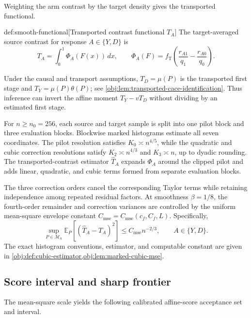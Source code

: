 \documentclass[11pt]{article}
\begin{document}
Weighting the arm contrast by the target density gives the transported functional.

\begin{definitionv}{def:smooth-functional}[Transported contrast functional \(T_A\)]
The target-averaged source contrast for response \(A\in\{Y,D\}\) is
\[
T_A=\int_0^1\Phi_A(F(x))\,dx,
\qquad
\Phi_A(F)=f_{\mathrm T}
\left(\frac{r_{A1}}{q_1}-\frac{r_{A0}}{q_0}\right).
\]
\end{definitionv}

Under the causal and transport assumptions, \(T_D=\mu(P)\) is the transported first stage and \(T_Y=\mu(P)\theta(P)\); see \cref{obj:lem:transported-cace-identification}. Thus inference can invert the affine moment \(T_Y-vT_D\) without dividing by an estimated first stage.

For \(n\ge n_0=256\), each source and target sample is split into one pilot block and three evaluation blocks. Blockwise marked histograms estimate all seven coordinates. The pilot resolution satisfies \(K_0\asymp n^{4/5}\), while the quadratic and cubic correction resolutions satisfy \(K_2\asymp n^{4/3}\) and \(K_3\asymp n\), up to dyadic rounding. The transported-contrast estimator \(\widehat T_A\) expands \(\Phi_A\) around the clipped pilot and adds linear, quadratic, and cubic terms formed from separate evaluation blocks.

The three correction orders cancel the corresponding Taylor terms while retaining independence among repeated residual factors. At smoothness \(\beta=1/8\), the fourth-order remainder and correction variances are controlled by the uniform mean-square envelope constant \(C_{\mathrm{mse}}=C_{\mathrm{mse}}(c_f,C_f,L)\). Specifically,
\[
\sup_{P\in\mathcal M_n}
\mathbb E_P\!\left[(\widehat T_A-T_A)^2\right]
\le C_{\mathrm{mse}}n^{-2/3},
\qquad A\in\{Y,D\}.
\]
The exact histogram conventions, estimator, and computable constant are given in \cref{obj:def:cubic-estimator,obj:lem:marked-cubic-mse}.

\subsection{Score interval and sharp frontier}

The mean-square scale yields the following calibrated affine-score acceptance set and interval.
\end{document}
